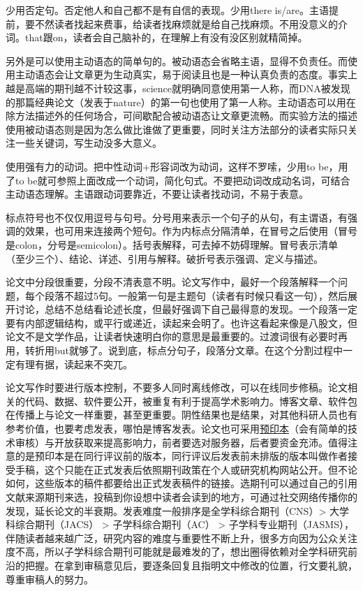 \documentclass[]{tufte-book}
\begin{document}
少用否定句。否定他人和自己都不是有自信的表现。少用there is/are。主语提前，要不然读者找起来费事，给读者找麻烦就是给自己找麻烦。不用没意义的介词。that跟on，读者会自己脑补的，在理解上有没有没区别就精简掉。

另外是可以使用主动语态的简单句的。被动语态会省略主语，显得不负责任。而使用主动语态会让文章更为生动真实，易于阅读且也是一种认真负责的态度。事实上越是高端的期刊越不计较这事，science就明确同意使用第一人称，而DNA被发现的那篇经典论文（发表于nature）的第一句也使用了第一人称。主动语态可以用在除方法描述外的任何场合，可间歇配合被动语态让文章更流畅。而实验方法的描述使用被动语态则是因为怎么做比谁做了更重要，同时关注方法部分的读者实际只关注一些关键词，写生动没多大意义。

使用强有力的动词。把中性动词+形容词改为动词，这样不罗嗦，少用to be，用了to be就可参照上面改成一个动词，简化句式。不要把动词改成动名词，可结合主动语态理解。主语跟动词要靠近，不要让读者找动词，不易于表意。

标点符号也不仅仅用逗号与句号。分号用来表示一个句子的从句，有主谓语，有强调的效果，也可用来连接两个短句。作为内标点分隔清单，在冒号之后使用（冒号是colon，分号是semicolon）。括号表解释，可去掉不妨碍理解。冒号表示清单（至少三个）、结论、详述、引用与解释。破折号表示强调、定义与描述。

论文中分段很重要，分段不清表意不明。论文写作中，最好一个段落解释一个问题，每个段落不超过5句。一般第一句是主题句（读者有时候只看这一句），然后展开讨论，总结不总结看论述长度，但最好强调下自己最得意的发现。一个段落一定要有内部逻辑结构，或平行或递近，读起来会明了。也许这看起来像是八股文，但论文不是文学作品，让读者快速明白你的意思是最重要的。过渡词很有必要时再用，转折用but就够了。说到底，标点分句子，段落分文章。在这个分割过程中一定有理有据，读起来不突兀。

论文写作时要进行版本控制，不要多人同时离线修改，可以在线同步修稿。论文相关的代码、数据、软件要公开，被重复有利于提高学术影响力。博客文章、软件包在传播上与论文一样重要，甚至更重要。阴性结果也是结果，对其他科研人员也有参考价值，也要考虑发表，哪怕是博客发表。论文也可采用\href{https://deevybee.blogspot.com/2018/06/preprint-publication-as-karaoke.html}{预印本}（会有简单的技术审核）与开放获取来提高影响力，前者要选对服务器，后者要资金充沛。值得注意的是预印本是在同行评议前的版本，同行评议后发表前未排版的版本叫做作者接受手稿，这个只能在正式发表后依照期刊政策在个人或研究机构网站公开。但不论如何，这些版本的稿件都要给出正式发表稿件的链接。选期刊可以通过自己的引用文献来源期刊来选，投稿到你设想中读者会读到的地方，可通过社交网络传播你的发现，延长论文的半衰期。发表难度一般排序是全学科综合期刊（CNS）\textgreater{} 大学科综合期刊（JACS） \textgreater{} 子学科综合期刊（AC） \textgreater{} 子学科专业期刊（JASMS），伴随读者越来越广泛，研究内容的难度与重要性不断上升，很多方向因为公众关注度不高，所以子学科综合期刊可能就是最难发的了，想出圈得依赖对全学科研究前沿的把握。在拿到审稿意见后，要逐条回复且指明文中修改的位置，行文要礼貌，尊重审稿人的努力。
\end{document}
